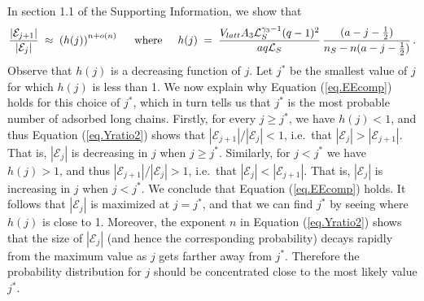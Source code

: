 \documentclass[journal=mamobx,manuscript=article]{achemso}
\newcommand{\leng}{\mathcal{L}}
\begin{document}
In section 1.1 of the Supporting Information, we show that
\begin{equation}
    \label{eq.Yratio2}
       \frac{|\mathcal{E}_{j+1}|}{|\mathcal{E}_j|} \; \approx \; \left( h(j)\right)^{n+o(n)}
       \hspace{5mm}\hbox{where}\hspace{5mm}
      h(j) \;=\;  \frac{ V_{latt}A_3\leng_S^{\gamma_3-1}(q-1)^2}{aq\leng_S} \,
          \frac{(a-j-\frac{1}{2})}{n_S-n(a-j-\frac{1}{2})}   \,.
\end{equation}
Observe that $h(j)$ is a  decreasing function of $j$.
Let $j^*$ be the smallest value of $j$ for which 
$h(j)$ is less than 1. 
We now explain why Equation (\ref{eq.EEcomp}) holds 
for this choice of $j^*$, which in turn tells us that
$j^*$ is the most probable 
number of adsorbed long chains.
Firstly, for every $j\geq j^*$, we have $h(j)<1$, 
and thus Equation (\ref{eq.Yratio2}) shows that 
$|\mathcal{E}_{j+1}|/|\mathcal{E}_j|<1$, i.e.\ that 
$|\mathcal{E}_j|>|\mathcal{E}_{j+1}|$.  That is, $|\mathcal{E}_j|$ is decreasing in $j$ when $j\geq j^*$.  
Similarly, for $j<j^*$ we have $h(j)>1$, and thus
$|\mathcal{E}_{j+1}|/|\mathcal{E}_j|> 1$, i.e.\ that
$|\mathcal{E}_j|<|\mathcal{E}_{j+1}|$.  That is, $|\mathcal{E}_j|$ is increasing in $j$ when $j< j^*$.
We conclude that Equation (\ref{eq.EEcomp}) holds.
It follows that $|\mathcal{E}_j|$ is maximized at $j=j^*$, and that we can find $j^*$ by seeing 
where $h(j)$
is close to 1.   
Moreover, the exponent $n$ in Equation (\ref{eq.Yratio2})
shows that the size of $|\mathcal{E}_j|$ (and hence the 
corresponding probability) decays rapidly from the maximum 
value as $j$ gets farther away from $j^*$.  Therefore the probability distribution for $j$ should be concentrated close to the most likely value $j^*$.
\end{document}
